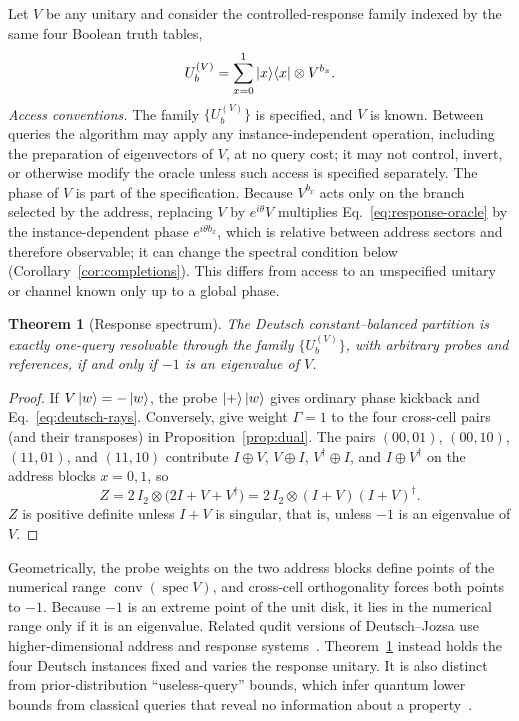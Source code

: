 \documentclass[
  aps,
  pra,
  reprint,
  nofootinbib
]{revtex4-2}
\newtheorem{theorem}{Theorem}
\begin{document}
Let \(V\) be any unitary and consider the controlled-response family indexed by
the same four Boolean truth tables,
\begin{equation}
 U_b^{(V)}
 =\sum_{x=0}^1\ket x\!\bra x\otimes V^{b_x}.
 \label{eq:response-oracle}
\end{equation}
\emph{Access conventions.} The family \(\{U_b^{(V)}\}\) is specified, and
\(V\) is known. Between queries the algorithm may apply any
instance-independent operation, including the preparation of eigenvectors of
\(V\), at no query cost; it may not control, invert, or otherwise modify the
oracle unless such access is specified separately. The phase of \(V\) is part
of the specification. Because \(V^{b_x}\) acts only on the branch selected by
the address, replacing \(V\) by \(e^{i\theta}V\) multiplies
Eq.~\eqref{eq:response-oracle} by the instance-dependent phase
\(e^{i\theta b_x}\), which is relative between address sectors and therefore
observable; it can change the spectral condition below
(Corollary~\ref{cor:completions}). This differs from access to an unspecified
unitary or channel known only up to a global phase.

\begin{theorem}[Response spectrum]\label{thm:spectrum}
The Deutsch constant--balanced partition is exactly one-query resolvable
through the family \(\{U_b^{(V)}\}\), with arbitrary probes and references, if
and only if
\(-1\) is an eigenvalue of \(V\).
\end{theorem}

\begin{proof}
If \(V\ket w=-\ket w\), the probe \(\ket+\ket w\) gives ordinary phase kickback
and Eq.~\eqref{eq:deutsch-rays}. Conversely, give weight \(\Gamma=1\) to the
four cross-cell pairs (and their transposes) in
Proposition~\ref{prop:dual}. The pairs \((00,01)\), \((00,10)\), \((11,01)\),
and \((11,10)\) contribute
\(I\oplus V\), \(V\oplus I\), \(V^\dagger\oplus I\), and \(I\oplus V^\dagger\)
on the address blocks \(x=0,1\), so
\begin{equation}
 Z=2\,I_2\otimes\bigl(2I+V+V^\dagger\bigr)
 =2\,I_2\otimes(I+V)(I+V)^\dagger .
 \label{eq:deutsch-witness}
\end{equation}
\(Z\) is positive definite unless \(I+V\) is singular, that is, unless \(-1\) is
an eigenvalue of \(V\).
\end{proof}

Geometrically, the probe weights on the two address blocks define points of
the numerical range \(\operatorname{conv}(\operatorname{spec}V)\), and
cross-cell orthogonality forces both points to \(-1\). Because \(-1\) is an
extreme point of the unit disk, it lies in the numerical range only if it is an
eigenvalue. Related qudit versions of Deutsch--Jozsa use higher-dimensional
address and response systems~\cite{Cereceda2004QuditDeutsch,deutsch:92,cleve:98}.
Theorem~\ref{thm:spectrum} instead holds the four Deutsch instances fixed and
varies the response unitary. It is also distinct from prior-distribution
``useless-query'' bounds, which infer quantum lower bounds from classical
queries that reveal no information about a property~\cite{MeyerPommersheim2011}.
\end{document}
